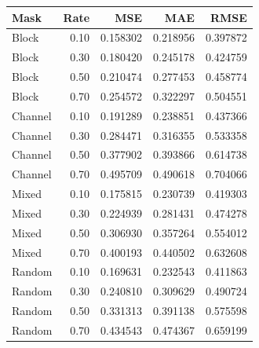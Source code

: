 \begin{tabular}{@{}lrrrr@{}}
\toprule
Mask & Rate & MSE & MAE & RMSE \\
\midrule
Block & 0.10 & 0.158302 & 0.218956 & 0.397872 \\
Block & 0.30 & 0.180420 & 0.245178 & 0.424759 \\
Block & 0.50 & 0.210474 & 0.277453 & 0.458774 \\
Block & 0.70 & 0.254572 & 0.322297 & 0.504551 \\
Channel & 0.10 & 0.191289 & 0.238851 & 0.437366 \\
Channel & 0.30 & 0.284471 & 0.316355 & 0.533358 \\
Channel & 0.50 & 0.377902 & 0.393866 & 0.614738 \\
Channel & 0.70 & 0.495709 & 0.490618 & 0.704066 \\
Mixed & 0.10 & 0.175815 & 0.230739 & 0.419303 \\
Mixed & 0.30 & 0.224939 & 0.281431 & 0.474278 \\
Mixed & 0.50 & 0.306930 & 0.357264 & 0.554012 \\
Mixed & 0.70 & 0.400193 & 0.440502 & 0.632608 \\
Random & 0.10 & 0.169631 & 0.232543 & 0.411863 \\
Random & 0.30 & 0.240810 & 0.309629 & 0.490724 \\
Random & 0.50 & 0.331313 & 0.391138 & 0.575598 \\
Random & 0.70 & 0.434543 & 0.474367 & 0.659199 \\
\bottomrule
\end{tabular}
